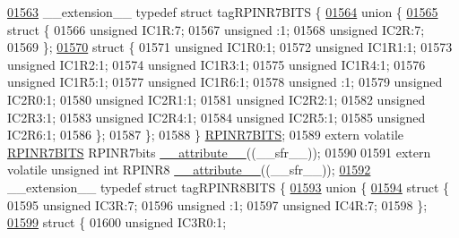 \begin{DoxyCode}
\hypertarget{a00015_source_l01563}{}\hyperlink{a00014}{01563} \_\_extension\_\_ \textcolor{keyword}{typedef} \textcolor{keyword}{struct }tagRPINR7BITS \{
\hypertarget{a00015_source_l01564}{}\hyperlink{a00015}{01564}   \textcolor{keyword}{union }\{
\hypertarget{a00015_source_l01565}{}\hyperlink{a00015}{01565}     \textcolor{keyword}{struct }\{
01566       \textcolor{keywordtype}{unsigned} IC1R:7;
01567       \textcolor{keywordtype}{unsigned} :1;
01568       \textcolor{keywordtype}{unsigned} IC2R:7;
01569     \};
\hypertarget{a00015_source_l01570}{}\hyperlink{a00015}{01570}     \textcolor{keyword}{struct }\{
01571       \textcolor{keywordtype}{unsigned} IC1R0:1;
01572       \textcolor{keywordtype}{unsigned} IC1R1:1;
01573       \textcolor{keywordtype}{unsigned} IC1R2:1;
01574       \textcolor{keywordtype}{unsigned} IC1R3:1;
01575       \textcolor{keywordtype}{unsigned} IC1R4:1;
01576       \textcolor{keywordtype}{unsigned} IC1R5:1;
01577       \textcolor{keywordtype}{unsigned} IC1R6:1;
01578       \textcolor{keywordtype}{unsigned} :1;
01579       \textcolor{keywordtype}{unsigned} IC2R0:1;
01580       \textcolor{keywordtype}{unsigned} IC2R1:1;
01581       \textcolor{keywordtype}{unsigned} IC2R2:1;
01582       \textcolor{keywordtype}{unsigned} IC2R3:1;
01583       \textcolor{keywordtype}{unsigned} IC2R4:1;
01584       \textcolor{keywordtype}{unsigned} IC2R5:1;
01585       \textcolor{keywordtype}{unsigned} IC2R6:1;
01586     \};
01587   \};
01588 \} \hyperlink{a00014_da/df7/a00739}{RPINR7BITS};
01589 \textcolor{keyword}{extern} \textcolor{keyword}{volatile} \hyperlink{a00014_da/df7/a00739}{RPINR7BITS} RPINR7bits \hyperlink{a00015_a493c46f03454991ccc5aa7a6e1dfb2a7}{\_\_attribute\_\_}((\_\_sfr\_\_));
01590 
01591 \textcolor{keyword}{extern} \textcolor{keyword}{volatile} \textcolor{keywordtype}{unsigned} \textcolor{keywordtype}{int}  RPINR8 \hyperlink{a00015_a493c46f03454991ccc5aa7a6e1dfb2a7}{\_\_attribute\_\_}((\_\_sfr\_\_));
\hypertarget{a00015_source_l01592}{}\hyperlink{a00014}{01592} \_\_extension\_\_ \textcolor{keyword}{typedef} \textcolor{keyword}{struct }tagRPINR8BITS \{
\hypertarget{a00015_source_l01593}{}\hyperlink{a00015}{01593}   \textcolor{keyword}{union }\{
\hypertarget{a00015_source_l01594}{}\hyperlink{a00015}{01594}     \textcolor{keyword}{struct }\{
01595       \textcolor{keywordtype}{unsigned} IC3R:7;
01596       \textcolor{keywordtype}{unsigned} :1;
01597       \textcolor{keywordtype}{unsigned} IC4R:7;
01598     \};
\hypertarget{a00015_source_l01599}{}\hyperlink{a00015}{01599}     \textcolor{keyword}{struct }\{
01600       \textcolor{keywordtype}{unsigned} IC3R0:1;

\end{DoxyCode}
